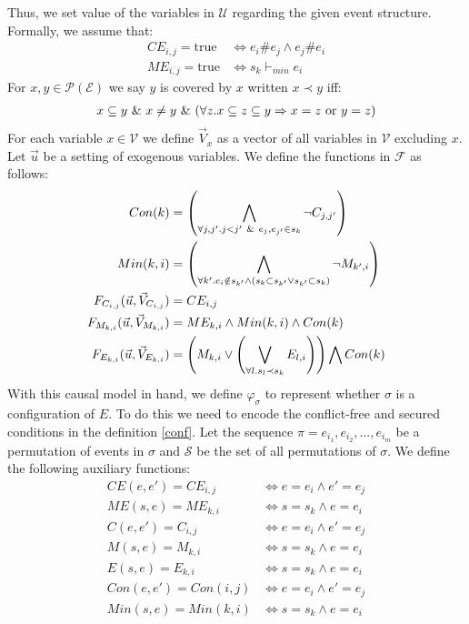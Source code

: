 \documentclass{article}
\begin{document}
Thus, we set value of the variables in $\mathcal{U}$ regarding
the given event structure.
Formally, we assume that:
\begin{align*}
    CE_{i,j} = \text{true} & \iff e_i \# e_j \wedge e_j\# e_i \\
    ME_{i,j} = \text{true} & \iff s_k \vdash_{min} e_i
\end{align*}
For $x,y \in \mathcal{P}(\mathcal{E})$ we say $y$ is covered by $x$ written $ x \prec y$ iff:
\begin{align*}
    x \subseteq y \ \& \  x \neq y \ \& \ 
    (\forall z. x \subseteq z \subseteq y \Rightarrow x = z
    \text{ or } y = z)
\end{align*}
For each variable $x \in \mathcal{V}$ we define $\vec V_x$ as a vector
of all variables in $\mathcal{V}$ excluding $x$.
Let $\vec u$ be a setting of exogenous variables.
We define the functions in $\mathcal{F}$ as follows:
\begin{align*}
    Con(k)                                & =   \left(
    \bigwedge_{\forall j,j'. j<j' \ \& \  e_j,e_{j'} \in s_k}
    \neg C_{j,j'}
    \right)                                                                          \\
    Min(k,i)                              & = \left(
    \bigwedge_{
        \forall k'. e_i \notin{s_{k'} \wedge \left(
            s_{k} \subset s_{k'} \vee s_{k'} \subset s_{k}
            \right)}
    } \neg M_{k',i}
    \right)                                                                          \\
    F_{C_{i,j}}(\vec u, \vec V_{C_{i,j}}) & = CE_{i,j}                               \\
    F_{M_{k,i}}(\vec u, \vec V_{M_{k,i}}) & = ME_{k,i} \wedge Min(k,i) \wedge Con(k) \\
    F_{E_{k,i}}(\vec u, \vec V_{E_{k,i}}) & =
    \left(
    M_{k,i} \vee
    \left(
    \bigvee_{\forall l. s_l  \prec s_k}E_{l,i}
    \right)
    \right)
    \bigwedge
    Con(k)
\end{align*}
With this causal model in hand, we define $\varphi_{\sigma}$ to represent whether $\sigma$ is a configuration of $E$.
To do this we need to encode the conflict-free and secured conditions in the definition \ref{conf}.
Let the sequence $\pi = e_{i_1},e_{i_2},...,e_{i_m}$ be a
permutation of events in $\sigma$ and $\mathcal{S}$ be the set of
all permutations of $\sigma$.
We define the following auxiliary functions:
\begin{align*}
    CE(e,e') = CE_{i,j}  & \iff e = e_i \wedge e' = e_j \\
    ME(s,e)  = ME_{k,i}  & \iff s = s_k \wedge e = e_i  \\
    C(e,e') = C_{i,j}    & \iff e = e_i \wedge e' = e_j \\
    M(s,e)  = M_{k,i}    & \iff s = s_k \wedge e = e_i  \\
    E(s,e)  = E_{k,i}    & \iff s = s_k \wedge e = e_i  \\
    Con(e,e') = Con(i,j) & \iff e = e_i \wedge e' = e_j \\
    Min(s,e) = Min(k,i)  & \iff  s = s_k \wedge e = e_i \\
\end{align*}
\end{document}
